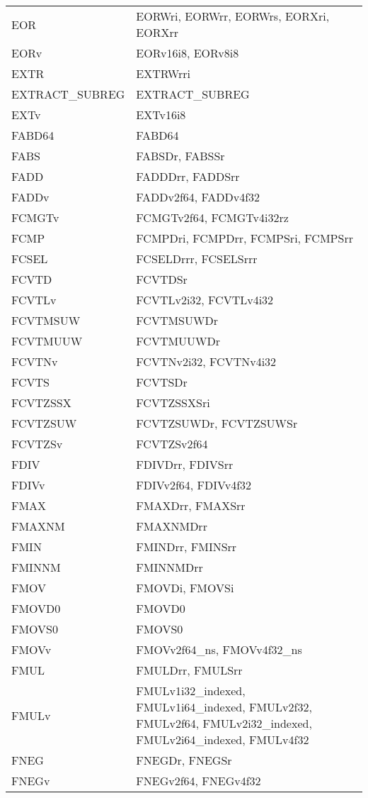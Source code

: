 \begin{xltabular}{\textwidth}{lX}
    EOR & EORWri, EORWrr, EORWrs, EORXri, EORXrr \\
    EORv & EORv16i8, EORv8i8 \\
    EXTR & EXTRWrri \\
    EXTRACT\_SUBREG & EXTRACT\_SUBREG \\
    EXTv & EXTv16i8 \\
    FABD64 & FABD64 \\
    FABS & FABSDr, FABSSr \\
    FADD & FADDDrr, FADDSrr \\
    FADDv & FADDv2f64, FADDv4f32 \\
    FCMGTv & FCMGTv2f64, FCMGTv4i32rz \\
    FCMP & FCMPDri, FCMPDrr, FCMPSri, FCMPSrr \\
    FCSEL & FCSELDrrr, FCSELSrrr \\
    FCVTD & FCVTDSr \\
    FCVTLv & FCVTLv2i32, FCVTLv4i32 \\
    FCVTMSUW & FCVTMSUWDr \\
    FCVTMUUW & FCVTMUUWDr \\
    FCVTNv & FCVTNv2i32, FCVTNv4i32 \\
    FCVTS & FCVTSDr \\
    FCVTZSSX & FCVTZSSXSri \\
    FCVTZSUW & FCVTZSUWDr, FCVTZSUWSr \\
    FCVTZSv & FCVTZSv2f64 \\
    FDIV & FDIVDrr, FDIVSrr \\
    FDIVv & FDIVv2f64, FDIVv4f32 \\
    FMAX & FMAXDrr, FMAXSrr \\
    FMAXNM & FMAXNMDrr \\
    FMIN & FMINDrr, FMINSrr \\
    FMINNM & FMINNMDrr \\
    FMOV & FMOVDi, FMOVSi \\
    FMOVD0 & FMOVD0 \\
    FMOVS0 & FMOVS0 \\
    FMOVv & FMOVv2f64\_ns, FMOVv4f32\_ns \\
    FMUL & FMULDrr, FMULSrr \\
    FMULv & FMULv1i32\_indexed, FMULv1i64\_indexed, FMULv2f32, FMULv2f64, FMULv2i32\_indexed, FMULv2i64\_indexed, FMULv4f32 \\
    FNEG & FNEGDr, FNEGSr \\
    FNEGv & FNEGv2f64, FNEGv4f32 \\

\end{xltabular}
